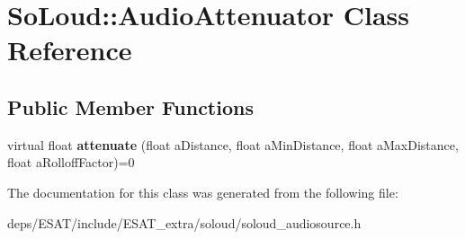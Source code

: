 \hypertarget{class_so_loud_1_1_audio_attenuator}{}\section{So\+Loud\+:\+:Audio\+Attenuator Class Reference}
\label{class_so_loud_1_1_audio_attenuator}
\subsection*{Public Member Functions}
\begin{DoxyCompactItemize}
\item 
\mbox{\label{class_so_loud_1_1_audio_attenuator_ac711201fd128b55f4870a0d887071829}} 
virtual float {\bfseries attenuate} (float a\+Distance, float a\+Min\+Distance, float a\+Max\+Distance, float a\+Rolloff\+Factor)=0
\end{DoxyCompactItemize}


The documentation for this class was generated from the following file\+:\begin{DoxyCompactItemize}
\item 
deps/\+E\+S\+A\+T/include/\+E\+S\+A\+T\+\_\+extra/soloud/soloud\+\_\+audiosource.\+h\end{DoxyCompactItemize}
